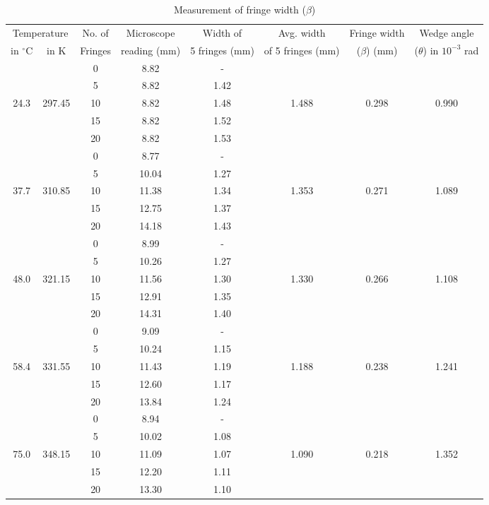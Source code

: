 \begin{table*}
    \centering
\begin{ruledtabular}
    \begin{tabular}{|c|c|c|c|c|c|c|c|}
        \multicolumn{2}{|c|}{Temperature} & No. of  & Microscope  & Width of  & Avg. width  & Fringe width  & Wedge angle  \\ 
         in $^{\circ}$C & in K & Fringes & reading (mm) & 5 fringes (mm) & of 5 fringes (mm) & ($\beta$) (mm) & ($\theta$) in $10^{-3}$ rad \\
        \hline
        &            & 0  & 8.82 & - & & &  \\
        &            & 5  & 8.82 & 1.42 & & &  \\
        24.3 & 297.45 & 10 & 8.82 & 1.48 & 1.488 & 0.298 & 0.990 \\
        &            & 15 & 8.82 & 1.52 & & & \\
        &            & 20 & 8.82 & 1.53 & & & \\
        \hline
        &            & 0  & 8.77  & - & & &  \\
        &            & 5  & 10.04 & 1.27 & & &  \\
        37.7 & 310.85& 10 & 11.38 & 1.34 & 1.353 & 0.271 & 1.089 \\
        &            & 15 & 12.75 & 1.37 & & & \\
        &            & 20 & 14.18 & 1.43 & & & \\
        \hline
        &            & 0  & 8.99 & - & & &  \\
        &            & 5  & 10.26 & 1.27 & & &  \\
        48.0 & 321.15& 10 & 11.56 & 1.30 & 1.330 & 0.266 & 1.108 \\
        &            & 15 & 12.91 & 1.35 & & & \\
        &            & 20 & 14.31 & 1.40 & & & \\
        \hline
        &            & 0  & 9.09 & - & & &  \\
        &            & 5  & 10.24 & 1.15 & & &  \\
        58.4 & 331.55& 10 & 11.43 & 1.19 & 1.188 & 0.238 & 1.241 \\
        &            & 15 & 12.60 & 1.17 & & & \\
        &            & 20 & 13.84 & 1.24 & & & \\
        \hline
        &            & 0  & 8.94 & - & & &  \\
        &            & 5  & 10.02 & 1.08 & & &  \\
        75.0 & 348.15& 10 & 11.09 & 1.07 & 1.090 & 0.218 & 1.352 \\
        &            & 15 & 12.20 & 1.11 & & & \\
        &            & 20 & 13.30 & 1.10 & & & \\
        \hline
    \end{tabular}
    \end{ruledtabular} 
    \caption{Measurement of fringe width ($\beta$)}
    \label{tab:1}
\end{table*}